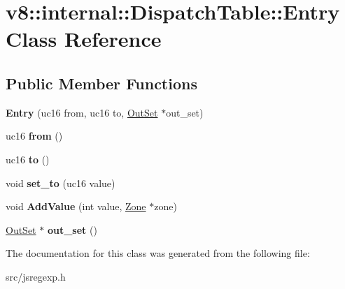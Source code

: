 \hypertarget{classv8_1_1internal_1_1_dispatch_table_1_1_entry}{}\section{v8\+:\+:internal\+:\+:Dispatch\+Table\+:\+:Entry Class Reference}
\label{classv8_1_1internal_1_1_dispatch_table_1_1_entry}
\subsection*{Public Member Functions}
\begin{DoxyCompactItemize}
\item 
\hypertarget{classv8_1_1internal_1_1_dispatch_table_1_1_entry_ae6c3ea78a9218835db9e10a1756a48c3}{}{\bfseries Entry} (uc16 from, uc16 to, \hyperlink{classv8_1_1internal_1_1_out_set}{Out\+Set} $\ast$out\+\_\+set)\label{classv8_1_1internal_1_1_dispatch_table_1_1_entry_ae6c3ea78a9218835db9e10a1756a48c3}

\item 
\hypertarget{classv8_1_1internal_1_1_dispatch_table_1_1_entry_a3788aa7f523199c0ab4621f611410c36}{}uc16 {\bfseries from} ()\label{classv8_1_1internal_1_1_dispatch_table_1_1_entry_a3788aa7f523199c0ab4621f611410c36}

\item 
\hypertarget{classv8_1_1internal_1_1_dispatch_table_1_1_entry_a7edd80a2ca980ada5bdc9c467dbce69c}{}uc16 {\bfseries to} ()\label{classv8_1_1internal_1_1_dispatch_table_1_1_entry_a7edd80a2ca980ada5bdc9c467dbce69c}

\item 
\hypertarget{classv8_1_1internal_1_1_dispatch_table_1_1_entry_a9abcae35a0d4fb05a08ff61835d1a70c}{}void {\bfseries set\+\_\+to} (uc16 value)\label{classv8_1_1internal_1_1_dispatch_table_1_1_entry_a9abcae35a0d4fb05a08ff61835d1a70c}

\item 
\hypertarget{classv8_1_1internal_1_1_dispatch_table_1_1_entry_a8fa8b735da68812c171572d669c6965e}{}void {\bfseries Add\+Value} (int value, \hyperlink{classv8_1_1internal_1_1_zone}{Zone} $\ast$zone)\label{classv8_1_1internal_1_1_dispatch_table_1_1_entry_a8fa8b735da68812c171572d669c6965e}

\item 
\hypertarget{classv8_1_1internal_1_1_dispatch_table_1_1_entry_ad0ba8c0ec934677a57c37f6f4eb9b1b0}{}\hyperlink{classv8_1_1internal_1_1_out_set}{Out\+Set} $\ast$ {\bfseries out\+\_\+set} ()\label{classv8_1_1internal_1_1_dispatch_table_1_1_entry_ad0ba8c0ec934677a57c37f6f4eb9b1b0}

\end{DoxyCompactItemize}


The documentation for this class was generated from the following file\+:\begin{DoxyCompactItemize}
\item 
src/jsregexp.\+h\end{DoxyCompactItemize}
